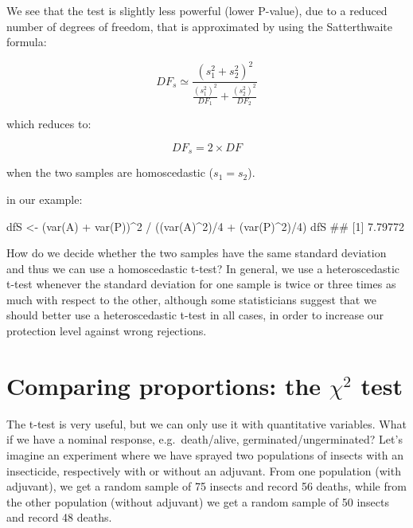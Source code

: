 \documentclass[a4paper,12pt,oneside]{book}
\newenvironment{Shaded}{\begin{snugshade}}{\end{snugshade}}
\newcommand{\DecValTok}[1]{#1}
\newcommand{\SpecialCharTok}[1]{#1}
\newcommand{\DocumentationTok}[1]{#1}
\newcommand{\OtherTok}[1]{#1}
\newcommand{\FunctionTok}[1]{#1}
\newcommand{\NormalTok}[1]{#1}
\begin{document}
We see that the test is slightly less powerful (lower P-value), due to a reduced number of degrees of freedom, that is approximated by using the Satterthwaite formula:

\[DF_s \simeq \frac{ \left( s^2_1 + s^2_2 \right)^2 }{ \frac{(s^2_1)^2}{DF_1} + \frac{(s^2_2)^2}{DF_2} }\]

which reduces to:

\[DF_s = 2 \times DF\]

when the two samples are homoscedastic (\(s_1 = s_2\)).

in our example:

\begin{Shaded}
\begin{Highlighting}[]
\NormalTok{dfS }\OtherTok{\textless{}{-}}\NormalTok{ (}\FunctionTok{var}\NormalTok{(A) }\SpecialCharTok{+} \FunctionTok{var}\NormalTok{(P))}\SpecialCharTok{\^{}}\DecValTok{2} \SpecialCharTok{/} 
\NormalTok{  ((}\FunctionTok{var}\NormalTok{(A)}\SpecialCharTok{\^{}}\DecValTok{2}\NormalTok{)}\SpecialCharTok{/}\DecValTok{4} \SpecialCharTok{+}\NormalTok{ (}\FunctionTok{var}\NormalTok{(P)}\SpecialCharTok{\^{}}\DecValTok{2}\NormalTok{)}\SpecialCharTok{/}\DecValTok{4}\NormalTok{)}
\NormalTok{dfS}
\DocumentationTok{\#\# [1] 7.79772}
\end{Highlighting}
\end{Shaded}

How do we decide whether the two samples have the same standard deviation and thus we can use a homoscedastic t-test? In general, we use a heteroscedastic t-test whenever the standard deviation for one sample is twice or three times as much with respect to the other, although some statisticians suggest that we should better use a heteroscedastic t-test in all cases, in order to increase our protection level against wrong rejections.

\hypertarget{comparing-proportions-the-chi2-test}{%
\section{\texorpdfstring{Comparing proportions: the \(\chi^2\) test}{Comparing proportions: the \textbackslash chi\^{}2 test}}\label{comparing-proportions-the-chi2-test}}

The t-test is very useful, but we can only use it with quantitative variables. What if we have a nominal response, e.g.~death/alive, germinated/ungerminated? Let's imagine an experiment where we have sprayed two populations of insects with an insecticide, respectively with or without an adjuvant. From one population (with adjuvant), we get a random sample of 75 insects and record 56 deaths, while from the other population (without adjuvant) we get a random sample of 50 insects and record 48 deaths.
\end{document}

